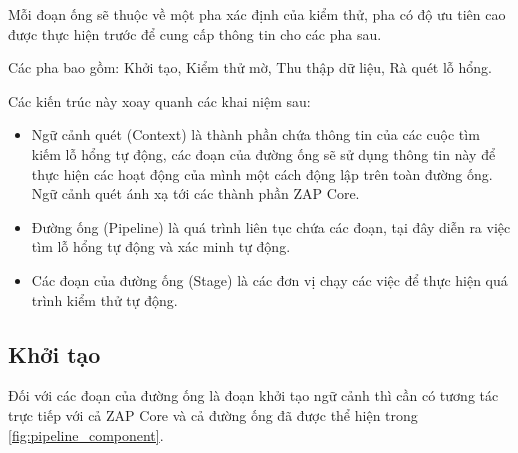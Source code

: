 \documentclass[./../main.tex]{subfiles}
\begin{document}
Mỗi đoạn ống sẽ thuộc về một pha xác định của kiểm thử, pha có độ ưu tiên
cao được thực hiện trước để cung cấp thông tin cho các pha sau.

Các pha bao gồm: Khởi tạo, Kiểm thử mờ, Thu thập dữ liệu, Rà quét lỗ hổng.

Các kiến trúc này xoay quanh các khai niệm sau:
\begin{itemize}
	\item Ngữ cảnh quét (Context) là thành phần chứa thông tin của các cuộc
	      tìm kiếm lỗ hổng tự động, các đoạn của đường ống sẽ sử dụng thông tin này để thực hiện các hoạt động của mình một cách động lập trên toàn đường ống. Ngữ cảnh quét ánh xạ tới các thành phần ZAP Core.
	\item Đường ống (Pipeline) là quá trình liên tục chứa các đoạn, tại đây
	      diễn ra việc tìm lỗ hổng tự động và xác minh tự động.
	\item Các đoạn của đường ống (Stage) là các đơn vị chạy các việc để thực
	      hiện quá trình kiểm thử tự động.
\end{itemize}

\subsection{Khởi tạo}

Đối với các đoạn của đường ống là đoạn khởi tạo ngữ cảnh thì cần có tương
tác trực tiếp với cả ZAP Core và cả đường ống đã được thể hiện trong \ref{fig:pipeline_component}.
\end{document}
